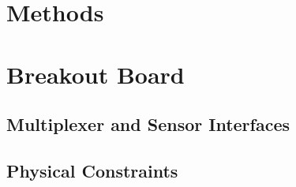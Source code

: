 \documentclass[
10pt, %
a4paper, %
oneside, %
headinclude,footinclude, %
BCOR5mm, %
]{scrartcl}
\begin{document}

\section{Methods}






\section{Breakout Board}


\subsection{Multiplexer and Sensor Interfaces}


\subsection{Physical Constraints}
\end{document}
